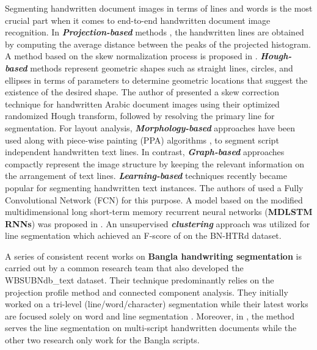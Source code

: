\documentclass[runningheads]{llncs}
\begin{document}
\raggedbottom
Segmenting handwritten document images in terms of lines and words is the most crucial part when it comes to end-to-end handwritten document image recognition. In \textit{\textbf{Projection-based}} methods \cite{fernandez2014graph}\cite{nicolaou2009handwritten}\cite{mullick2015efficient}\cite{boukharouba2017new}, the handwritten lines are obtained by computing the average distance between the peaks of the projected histogram. A method based on the skew normalization process is proposed in \cite{bal2018improved}. \textbf{\textit{Hough-based}} methods \cite{fernandez2014graph} represent geometric shapes such as straight lines, circles, and ellipses in terms of parameters to determine geometric locations that suggest the existence of the desired shape. The author of \cite{boukharouba2017new} presented a skew correction technique for handwritten Arabic document images using their optimized randomized Hough transform, followed by resolving the primary line for segmentation. For layout analysis, \textit{\textbf{Morphology-based}} approaches \cite{fernandez2014graph}\cite{boudraa2017improved} have been used along with piece-wise painting (PPA) algorithms \cite{alaei2011new}, to segment script independent handwritten text lines. In contrast, \textit{\textbf{Graph-based}} approaches \cite{fernandez2014graph}\cite{surinta2014path}\cite{kumar2011segmentation} compactly represent the image structure by keeping the relevant information on the arrangement of text lines. \textbf{\textit{Learning-based}} techniques recently became popular for segmenting handwritten text instances. The authors of \cite{renton2017handwritten}\cite{vo2016dense}\cite{renton2018fully}\cite{barakat2018text} used a Fully Convolutional Network (FCN) for this purpose.
A model based on the modified multidimensional long short-term memory recurrent neural networks (\textbf{MDLSTM RNNs}) was proposed in \cite{bluche2016joint}. An unsupervised \textbf{\textit{clustering}} approach \cite{rahman2023bn} was utilized for line segmentation which achieved an F-score of  on the BN-HTRd dataset.

A series of consistent recent works on \textbf{Bangla handwriting segmentation} \cite{rakshit2018line}\cite{agarwal2022word}\cite{rakshit2023generalized} is carried out by a common research team that also developed the WBSUBNdb\_text dataset. Their technique predominantly relies on the projection profile method and connected component analysis. They initially worked on a tri-level (line/word/character) segmentation \cite{rakshit2018line} while their latest works are focused solely on word \cite{agarwal2022word} and line segmentation \cite{rakshit2023generalized}. Moreover, in \cite{rakshit2023generalized}, the method serves the line segmentation on multi-script handwritten documents while the other two research only work for the Bangla scripts.
\end{document}
